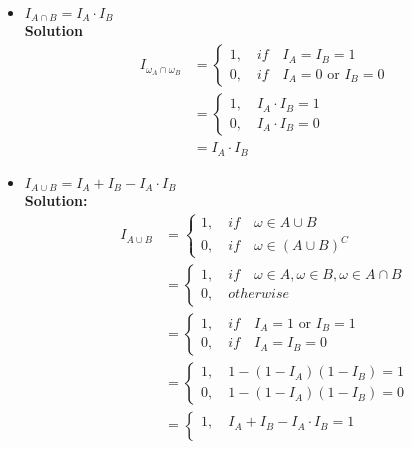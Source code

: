 \documentclass{article}
\begin{document}
\begin{enumerate}
\begin{itemize}
        \item $I_{A \cap B}=I_A \cdot I_B$\\
        \textbf{Solution}
        \begin{align*}
            I_{\omega_A \cap \omega_B} &= \begin{cases}
                1 ,\quad if \quad I_{A} = I_B =1 \\
                0 , \quad if \quad I_{A}=0 \text{ or } I_B =0
            \end{cases}\\
            &= \begin{cases}
                1, \quad I_A \cdot I_B=1\\
                0, \quad I_A \cdot I_B = 0
            \end{cases}\\
            &= I_{A} \cdot I_B
        \end{align*}
        \item $I_{A \cup B} = I_A + I_B - I_A \cdot I_B$\\
        \textbf{Solution:}
         \begin{align*}
             I_{A \cup B}&= \begin{cases}
                 1 , \quad if \quad \omega \in A \cup B\\
                 0, \quad if \quad \omega \in (A \cup B)^C
             \end{cases}\\
             &= \begin{cases}
                 1, \quad if \quad \omega \in A , \omega \in B, \omega \in A \cap B\\
                 0, \quad otherwise
             \end{cases}\\
             &= \begin{cases}
                 1, \quad if \quad I_A=1 \text{ or } I_B =1\\
                 0, \quad if \quad I_A= I_B=0
             \end{cases} \\
             &= \begin{cases}
                 1, \quad 1-(1-I_A)(1-I_B)=1\\
                 0, \quad 1-(1-I_A)(1-I_B)=0
             \end{cases}\\
             &= \begin{cases}
                 1, \quad  I_A+I_B-I_A \cdot I_B=1\\

\end{cases}
\end{align*}
\end{itemize}
\end{enumerate}
\end{document}
